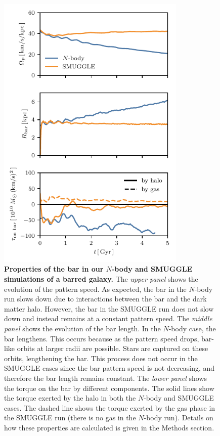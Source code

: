 \documentclass[twoside]{natureprintstyle}
\newcommand{\Nbody}{$N$-body}
\begin{document}
\begin{figure}[h!]%
\centering
\includegraphics[width=9cm]{fig/ps_Rbar_torque.pdf}
\caption{\textbf{Properties of the bar in our \boldmath$N$-body and SMUGGLE
simulations of a barred galaxy.} The \textit{upper panel} shows the evolution
of the pattern speed. As expected, the bar in the \Nbody{} run slows down due
to interactions between the bar and the dark matter halo. However, the bar in
the SMUGGLE run does not slow down and instead remains at a constant pattern
speed. The \textit{middle panel} shows the evolution of the bar length. In the
\Nbody{} case, the bar lengthens. This occurs because as the pattern speed
drops, bar-like orbits at larger radii are possible. Stars are captured on
these orbits, lengthening the bar. This process does not occur in the SMUGGLE
cases since the bar pattern speed is not decreasing, and therefore the bar
length remains constant. The \textit{lower panel} shows the torque on the bar
by different components. The solid lines show the torque exerted by the halo
in both the \Nbody{} and SMUGGLE cases. The dashed line shows the torque
exerted by the gas phase in the SMUGGLE run (there is no gas in the \Nbody{}
run). Details on how these properties are calculated is given in the Methods
section.}\label{fig:prop}
\end{figure}
\end{document}
